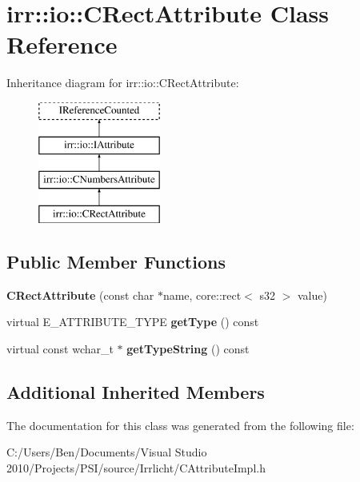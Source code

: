 \hypertarget{classirr_1_1io_1_1_c_rect_attribute}{\section{irr\-:\-:io\-:\-:C\-Rect\-Attribute Class Reference}
\label{classirr_1_1io_1_1_c_rect_attribute}
}
Inheritance diagram for irr\-:\-:io\-:\-:C\-Rect\-Attribute\-:\begin{figure}[H]
\begin{center}
\leavevmode
\includegraphics[height=4.000000cm]{classirr_1_1io_1_1_c_rect_attribute}
\end{center}
\end{figure}
\subsection*{Public Member Functions}
\begin{DoxyCompactItemize}
\item 
\hypertarget{classirr_1_1io_1_1_c_rect_attribute_ae293e405f7f7bfe1b7f79fd20a3c35e9}{{\bfseries C\-Rect\-Attribute} (const char $\ast$name, core\-::rect$<$ s32 $>$ value)}\label{classirr_1_1io_1_1_c_rect_attribute_ae293e405f7f7bfe1b7f79fd20a3c35e9}

\item 
\hypertarget{classirr_1_1io_1_1_c_rect_attribute_a723f1e07c13660728f832be0b5301f55}{virtual E\-\_\-\-A\-T\-T\-R\-I\-B\-U\-T\-E\-\_\-\-T\-Y\-P\-E {\bfseries get\-Type} () const }\label{classirr_1_1io_1_1_c_rect_attribute_a723f1e07c13660728f832be0b5301f55}

\item 
\hypertarget{classirr_1_1io_1_1_c_rect_attribute_a39830c624f458e4b845389fceed128fb}{virtual const wchar\-\_\-t $\ast$ {\bfseries get\-Type\-String} () const }\label{classirr_1_1io_1_1_c_rect_attribute_a39830c624f458e4b845389fceed128fb}

\end{DoxyCompactItemize}
\subsection*{Additional Inherited Members}


The documentation for this class was generated from the following file\-:\begin{DoxyCompactItemize}
\item 
C\-:/\-Users/\-Ben/\-Documents/\-Visual Studio 2010/\-Projects/\-P\-S\-I/source/\-Irrlicht/C\-Attribute\-Impl.\-h\end{DoxyCompactItemize}
